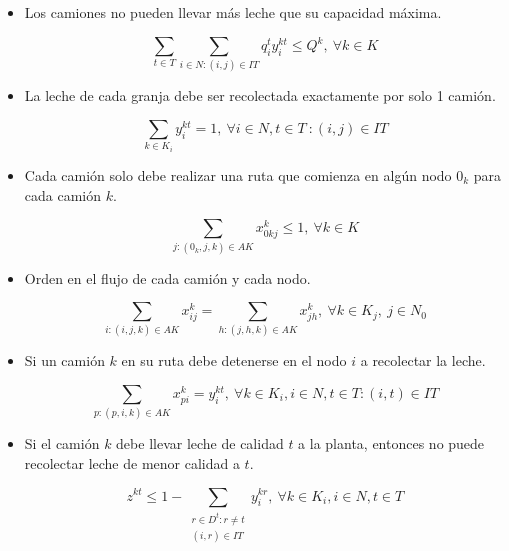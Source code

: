 \documentclass[letter, 10pt]{article}
\begin{document}
\begin{itemize}
    \item Los camiones no pueden llevar m\'as leche que su capacidad m\'axima.
    
    \begin{equation}
        \sum_{t \in T} \sum_{i \in N : (i,j) \in IT} q_i^t y^{kt}_i \leq Q^k, \: \forall k \in K
    \end{equation}
    
     \item La leche de cada granja debe ser recolectada exactamente por solo 1 cami\'on.
     
     \begin{equation}
         \sum_{k \in K_i} y_i^{kt} = 1, \: \forall i \in N, t \in T \:: (i,j) \in IT
     \end{equation}
     
     \item Cada cami\'on solo debe realizar una ruta que comienza en alg\'un nodo $0_k$ para cada cami\'on $k$.
     
     \begin{equation}
         \sum_{j:(0_k,j,k) \in AK} x^k_{0kj} \leq 1, \: \forall k \in K 
     \end{equation}
     
     \item Orden en el flujo de cada cami\'on y cada nodo.
     
     \begin{equation}
         \sum_{i:(i,j,k)\in AK} x^k_{ij} = \sum_{h:(j,h,k)\in AK} x^k_{jh}, \: \forall k \in K_j,\: j \in N_0
     \end{equation}
     
     \item Si un cami\'on $k$ en su ruta debe detenerse en el nodo $i$ a recolectar la leche.
     
     \begin{equation}
         \sum_{p:(p,i,k)\in AK} x^k_{pi} = y^{kt}_i, \: \forall k \in K_i, i \in N, t \in T : (i,t) \in IT
     \end{equation}
     
     \item Si el cami\'on $k$ debe llevar leche de calidad $t$ a la planta, entonces no puede recolectar leche de menor calidad a $t$.
     
     \begin{equation}
         z^{kt} \leq 1 - \sum_{\substack{r \in D^t : r \neq t \\ (i,r) \in IT}} y^{kr}_i, \: \forall k \in K_i, i \in N, t \in T
     \end{equation}
     

\end{itemize}
\end{document}
